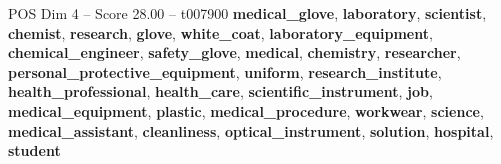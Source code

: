\begin{textsample}{POS Dim 4 – Score 28.00 – t007900}  \label{ex:f4_pos_040}
\textbf{medical\_glove}, \textbf{laboratory}, \textbf{scientist}, \textbf{chemist}, \textbf{research}, \textbf{glove}, \textbf{white\_coat}, \textbf{laboratory\_equipment}, \textbf{chemical\_engineer}, \textbf{safety\_glove}, \textbf{medical}, \textbf{chemistry}, \textbf{researcher}, \textbf{personal\_protective\_equipment}, \textbf{uniform}, \textbf{research\_institute}, \textbf{health\_professional}, \textbf{health\_care}, \textbf{scientific\_instrument}, \textbf{job}, \textbf{medical\_equipment}, \textbf{plastic}, \textbf{medical\_procedure}, \textbf{workwear}, \textbf{science}, \textbf{medical\_assistant}, \textbf{cleanliness}, \textbf{optical\_instrument}, \textbf{solution}, \textbf{hospital}, \textbf{student}

\end{textsample}
